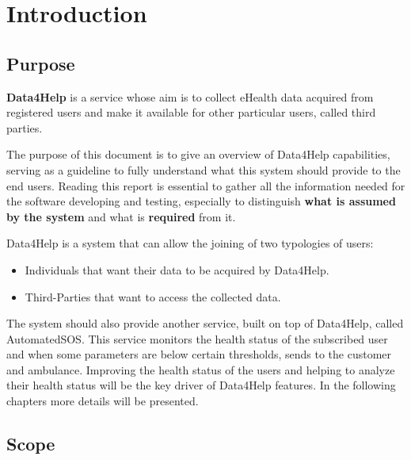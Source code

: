 
\chapter{Introduction}
\section{Purpose}

\textbf{Data4Help} is a service whose aim is to collect eHealth data acquired from registered users and make it available for other particular users, called third parties.

\par \noindent \newline
The purpose of this document is to give an overview of Data4Help capabilities, serving as a guideline to fully understand what this system should provide to the end users. Reading this report
is essential to gather all the information needed for the software developing and testing, especially to distinguish  \textbf{what is assumed by the system} and what is \textbf{required} from it.

\par \noindent \newline
Data4Help is a system that can allow the joining of two typologies of users:
\begin{itemize}
\item Individuals that want their data to be acquired by Data4Help.
\item Third-Parties that want to access the collected data.
\end{itemize}
The system should also provide another service, built on top of Data4Help, called AutomatedSOS.
\newline
 This service monitors the health status of the subscribed user and when some parameters are below certain thresholds, sends to the customer and ambulance.
\newline
Improving the health status of the users and helping to analyze their health status will be the key driver of Data4Help features.
\newline
In the following chapters more details will be presented.


\section{Scope}
